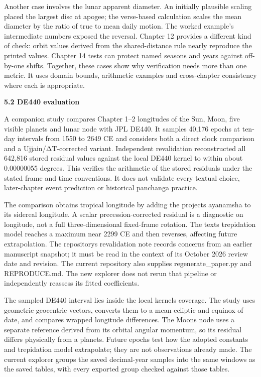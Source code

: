 \documentclass[
]{article}
\begin{document}
Another case involves the lunar apparent diameter. An initially
plausible scaling placed the largest disc at apogee; the verse-based
calculation scales the mean diameter by the ratio of true to mean daily
motion. The worked example's intermediate numbers exposed the reversal.
Chapter 12 provides a different kind of check: orbit values derived from
the shared-distance rule nearly reproduce the printed values. Chapter 14
tests can protect named seasons and years against off-by-one shifts.
Together, these cases show why verification needs more than one metric.
It uses domain bounds, arithmetic examples and cross-chapter consistency
where each is appropriate.

\textbf{5.2 DE440 evaluation}

A companion study compares Chapter 1--2 longitudes of the Sun, Moon,
five visible planets and lunar node with JPL DE440. It samples 40,176
epochs at ten-day intervals from 1550 to 2649 CE and considers both a
direct clock comparison and a Ujjain/ΔT-corrected variant. Independent
revalidation reconstructed all 642,816 stored residual values against
the local DE440 kernel to within about 0.00000055 degrees. This verifies
the arithmetic of the stored residuals under the stated frame and time
conventions. It does not validate every textual choice, later-chapter
event prediction or historical panchanga practice.

The comparison obtains tropical longitude by adding the
project\textquotesingle s ayanamsha to its sidereal longitude. A scalar
precession-corrected residual is a diagnostic on longitude, not a full
three-dimensional fixed-frame rotation. The text\textquotesingle s
trepidation model reaches a maximum near 2299 CE and then reverses,
affecting future extrapolation. The repository\textquotesingle s
revalidation note records concerns from an earlier manuscript snapshot;
it must be read in the context of its October 2026 review date and
revision. The current repository also supplies regenerate\_paper.py and
REPRODUCE.md. The new explorer does not rerun that pipeline or
independently reassess its fitted coefficients.

The sampled DE440 interval lies inside the local
kernel\textquotesingle s coverage. The study uses geometric geocentric
vectors, converts them to a mean ecliptic and equinox of date, and
compares wrapped longitude differences. The Moon\textquotesingle s node
uses a separate reference derived from its orbital angular momentum, so
its residual differs physically from a planet\textquotesingle s. Future
epochs test how the adopted constants and trepidation model extrapolate;
they are not observations already made. The current explorer groups the
saved decimal-year samples into the same windows as the saved tables,
with every exported group checked against those tables.
\end{document}
